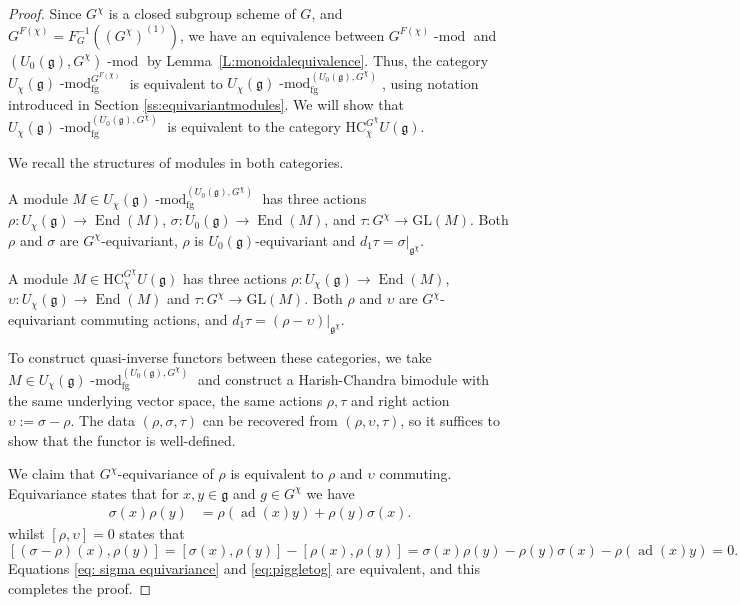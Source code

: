 \documentclass[twoside,12pt,reqno]{amsart}
\theoremstyle{remark}
\numberwithin{equation}{section}
\def\lmod{\!\operatorname{-mod}}
\def\ad{\operatorname{ad}}
\def\End{\operatorname{End}}
\def\GL{\mathrm{GL}}
\def\HC{\mathrm{HC}}
\def\g{{\mathfrak g}}
\newcommand{\fg}{\operatorname{fg}}
\begin{document}
\begin{proof}
    Since $G^\chi$ is a closed subgroup scheme of $G$, and $G^{F(\chi)} = F^{-1}_G ((G^{\chi})^{(1)})$, we have an equivalence between $G^{F(\chi)} \lmod$ and $(U_0 (\g), G^\chi)\lmod$ by Lemma~\ref{L:monoidalequivalence}.
    Thus, the category $U_\chi(\g) \lmod^{G^{F(\chi)}}_{\fg}$ is equivalent to $U_\chi(\g) \lmod^{(U_0(\g), G^\chi)}_{\fg}$, using notation introduced in Section \ref{ss:equivariantmodules}.
    We will show that $U_\chi(\g) \lmod^{(U_0(\g), G^\chi)}_{\fg}$ is equivalent to the category $\HC_\chi^{G^\chi} U(\g)$.

    We recall the structures of modules in both categories.
    
    A module $M \in U_\chi(\g) \lmod^{(U_0(\g), G^\chi)}_{\fg}$ has three actions $\rho \colon U_\chi(\g) \rightarrow \End(M)$, $\sigma \colon U_0(\g) \rightarrow \End(M)$, and $\tau \colon G^\chi \rightarrow \GL(M)$. Both $\rho$ and $\sigma$ are $G^\chi$-equivariant, $\rho$ is $U_0(\g)$-equivariant and $d_1\tau = \sigma|_{\g^\chi}$.

    A module $M \in \HC_\chi^{G^\chi} U(\g)$ has three actions $\rho \colon U_\chi(\g) \rightarrow \End(M)$, $\upsilon \colon U_{\chi}(\g) \to \End(M)$ and $\tau : G^\chi \to \GL(M)$. Both $\rho$ and $\upsilon$ are $G^\chi$-equivariant commuting actions, and $d_1 \tau = (\rho - \upsilon)|_{\g^\chi}$.

    To construct quasi-inverse functors between these categories, we take $M \in U_\chi(\g) \lmod^{(U_0(\g), G^\chi)}_{\fg}$ and construct a Harish-Chandra bimodule with the same underlying vector space, the same actions $\rho, \tau$ and right action $\upsilon := \sigma - \rho$. The data $(\rho, \sigma, \tau)$ can be recovered from $(\rho, \upsilon, \tau)$, so it suffices to show that the functor is well-defined.
    
    We claim that $G^\chi$-equivariance of $\rho$ is equivalent to $\rho$ and $\upsilon$ commuting. Equivariance states that
    for $x, y \in \g$ and $g \in G^\chi$ we have
    \begin{align}
        \sigma(x) \rho(y) &= \rho(\ad(x)y) + \rho(y)\sigma(x). \label{eq: sigma equivariance}
    \end{align}
    whilst $[\rho, \upsilon] = 0$ states that
    \begin{equation}
    \label{eq:piggletog}
        [(\sigma - \rho)(x), \rho(y)] = [\sigma(x), \rho(y)] - [\rho(x), \rho(y)] = \sigma(x) \rho(y) - \rho(y) \sigma(x) - \rho(\ad(x)y) = 0.
    \end{equation}
    Equations \eqref{eq: sigma equivariance} and \eqref{eq:piggletog} are equivalent, and this completes the proof.
\end{proof}
\end{document}
